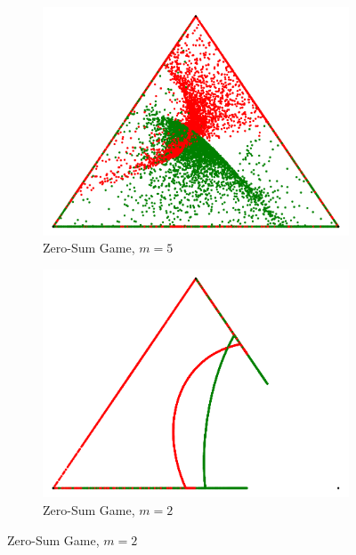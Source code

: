 \documentclass[a4paper]{scrreprt}
\begin{document}
    \begin{figure}[h]
        \centering
        \begin{subfigure}[t]{0.49\textwidth}
            \includegraphics[width=\textwidth]{Pictures/paretoNash-curvyRegionsManyOutliers-k5.pdf}
            \caption{Zero-Sum Game, $m=5$}
        \end{subfigure}
        \begin{subfigure}[t]{0.49\textwidth}
            \includegraphics[width=\textwidth]{Pictures/paretoNash-curves1-k2.pdf}
            \caption{Zero-Sum Game, $m=2$}
        \end{subfigure}
        
        \vspace*{0.01\textwidth}
        

\end{figure}
\end{document}
